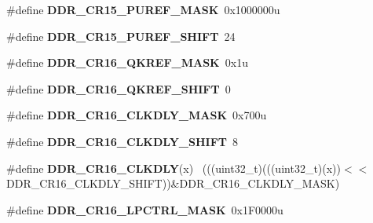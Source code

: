 \begin{DoxyCompactItemize}
\item 
\hypertarget{group___d_d_r___register___masks_gaca2b4b2b867b56edfb4d2f776a655ae8}{}\#define {\bfseries D\+D\+R\+\_\+\+C\+R15\+\_\+\+P\+U\+R\+E\+F\+\_\+\+M\+A\+S\+K}~0x1000000u\label{group___d_d_r___register___masks_gaca2b4b2b867b56edfb4d2f776a655ae8}

\item 
\hypertarget{group___d_d_r___register___masks_ga2ca64111b719a4cd19448d7704b69533}{}\#define {\bfseries D\+D\+R\+\_\+\+C\+R15\+\_\+\+P\+U\+R\+E\+F\+\_\+\+S\+H\+I\+F\+T}~24\label{group___d_d_r___register___masks_ga2ca64111b719a4cd19448d7704b69533}

\item 
\hypertarget{group___d_d_r___register___masks_ga45134f9ae0f9277f06f5804608be973f}{}\#define {\bfseries D\+D\+R\+\_\+\+C\+R16\+\_\+\+Q\+K\+R\+E\+F\+\_\+\+M\+A\+S\+K}~0x1u\label{group___d_d_r___register___masks_ga45134f9ae0f9277f06f5804608be973f}

\item 
\hypertarget{group___d_d_r___register___masks_gada3b482c0751f383aeb5938275a9ff4a}{}\#define {\bfseries D\+D\+R\+\_\+\+C\+R16\+\_\+\+Q\+K\+R\+E\+F\+\_\+\+S\+H\+I\+F\+T}~0\label{group___d_d_r___register___masks_gada3b482c0751f383aeb5938275a9ff4a}

\item 
\hypertarget{group___d_d_r___register___masks_ga967ed75b116fa6a9258b76273d49164b}{}\#define {\bfseries D\+D\+R\+\_\+\+C\+R16\+\_\+\+C\+L\+K\+D\+L\+Y\+\_\+\+M\+A\+S\+K}~0x700u\label{group___d_d_r___register___masks_ga967ed75b116fa6a9258b76273d49164b}

\item 
\hypertarget{group___d_d_r___register___masks_gaf2262538a7ca3f2d59aeec28c4e1b8a0}{}\#define {\bfseries D\+D\+R\+\_\+\+C\+R16\+\_\+\+C\+L\+K\+D\+L\+Y\+\_\+\+S\+H\+I\+F\+T}~8\label{group___d_d_r___register___masks_gaf2262538a7ca3f2d59aeec28c4e1b8a0}

\item 
\hypertarget{group___d_d_r___register___masks_ga475927df4a9153a5d28e1892d4db074f}{}\#define {\bfseries D\+D\+R\+\_\+\+C\+R16\+\_\+\+C\+L\+K\+D\+L\+Y}(x)                                          ~(((uint32\+\_\+t)(((uint32\+\_\+t)(x))$<$$<$D\+D\+R\+\_\+\+C\+R16\+\_\+\+C\+L\+K\+D\+L\+Y\+\_\+\+S\+H\+I\+F\+T))\&D\+D\+R\+\_\+\+C\+R16\+\_\+\+C\+L\+K\+D\+L\+Y\+\_\+\+M\+A\+S\+K)\label{group___d_d_r___register___masks_ga475927df4a9153a5d28e1892d4db074f}

\item 
\hypertarget{group___d_d_r___register___masks_gaccbb43e4c1e4d0a8f8b75ac8d2c2ab77}{}\#define {\bfseries D\+D\+R\+\_\+\+C\+R16\+\_\+\+L\+P\+C\+T\+R\+L\+\_\+\+M\+A\+S\+K}~0x1\+F0000u\label{group___d_d_r___register___masks_gaccbb43e4c1e4d0a8f8b75ac8d2c2ab77}


\end{DoxyCompactItemize}
